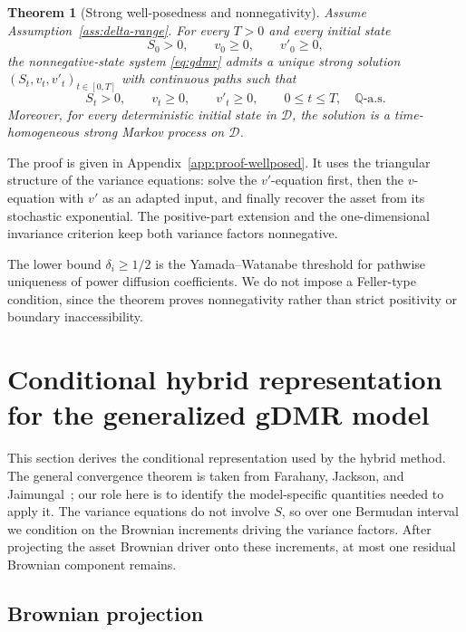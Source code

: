 \documentclass[pdflatex,sn-mathphys-num]{sn-jnl}
\theoremstyle{thmstyleone}%
\newtheorem{theorem}{Theorem}[section]
\theoremstyle{thmstylethree}%
\theoremstyle{thmstyletwo}%
\newcommand{\Q}{\mathbb Q}
\begin{document}
\begin{theorem}[Strong well-posedness and nonnegativity]\label{thm:wellposed}
Assume Assumption~\ref{ass:delta-range}. For every $T>0$ and every initial
state
$$
S_0>0,\qquad v_0\ge0,\qquad v'_0\ge0,
$$
the nonnegative-state system \eqref{eq:gdmr} admits a unique strong solution
$(S_t,v_t,v'_t)_{t\in[0,T]}$ with continuous paths such that
$$
S_t>0,\qquad v_t\ge0,\qquad v'_t\ge0,\qquad
0\le t\le T,\quad \Q\text{-a.s.}
$$
Moreover, for every deterministic initial state in $\mathcal D$, the solution
is a time-homogeneous strong Markov process on $\mathcal D$.
\end{theorem}

The proof is given in Appendix~\ref{app:proof-wellposed}. It uses the
triangular structure of the variance equations: solve the $v'$-equation first,
then the $v$-equation with $v'$ as an adapted input, and finally recover the
asset from its stochastic exponential. The positive-part extension and the
one-dimensional invariance criterion keep both variance factors nonnegative.

The lower bound $\delta_i\ge1/2$ is the Yamada--Watanabe threshold for
pathwise uniqueness of power diffusion coefficients. We do not impose a
Feller-type condition, since the theorem proves nonnegativity rather than strict
positivity or boundary inaccessibility.

\section{Conditional hybrid representation for the generalized gDMR model}\label{sec:conditional_pde}

This section derives the conditional representation used by the hybrid method.
The general convergence theorem is taken from Farahany, Jackson, and
Jaimungal~\cite{farahany2020mixing}; our role here is to identify the
model-specific quantities needed to apply it. The variance equations do not
involve $S$, so over one Bermudan interval we condition on the Brownian
increments driving the variance factors. After projecting the asset Brownian
driver onto these increments, at most one residual Brownian component remains.

\subsection{Brownian projection}
\end{document}
